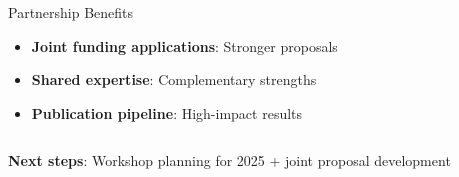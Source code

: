 \documentclass[aspectratio=169]{beamer}
\begin{document}
\begin{frame}
\begin{columns}
\begin{block}{Partnership Benefits}
\begin{itemize}
                \item \textbf{Joint funding applications}: Stronger proposals
                \item \textbf{Shared expertise}: Complementary strengths
                \item \textbf{Publication pipeline}: High-impact results
            \end{itemize}
        \end{block}
    \end{columns}
    \vspace{10pt}
    \begin{center}
        \textbf{Next steps}: Workshop planning for 2025 + joint proposal development
    \end{center}
\end{frame}
\end{document}
